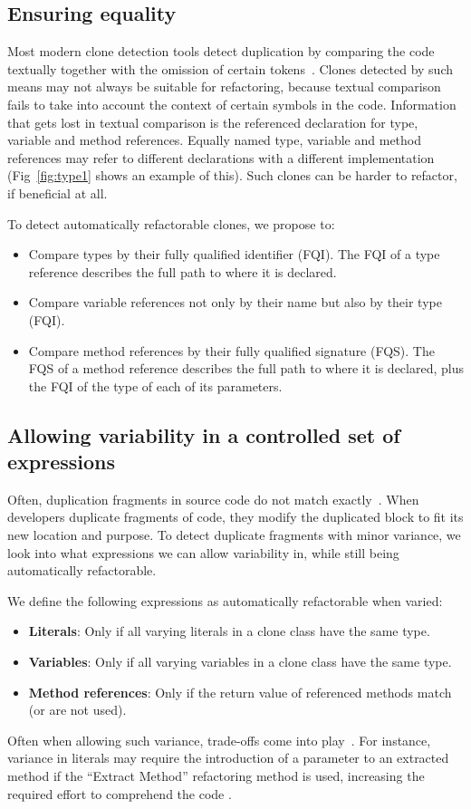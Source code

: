 \documentclass[a4paper,UKenglish,cleveref, autoref, thm-restate,authorcolumns]{lipics-v2019}
\begin{document}
\subsection{Ensuring equality}\label{sec:t1r}
Most modern clone detection tools detect duplication by comparing the code textually together with the omission of certain tokens~\cite{roy2009comparison, svajlenko2014evaluating}. Clones detected by such means may not always be suitable for refactoring, because textual comparison fails to take into account the context of certain symbols in the code. Information that gets lost in textual comparison is the referenced declaration for type, variable and method references. Equally named type, variable and method references may refer to different declarations with a different implementation (Fig~\ref{fig:type1} shows an example of this). Such clones can be harder to refactor, if beneficial at all.

To detect automatically refactorable clones, we propose to:
\begin{itemize}
  \item Compare types by their fully qualified identifier (FQI). The FQI of a type reference describes the full path to where it is declared.
  \item Compare variable references not only by their name but also by their type (FQI).
  \item Compare method references by their fully qualified signature (FQS). The FQS of a method reference describes the full path to where it is declared, plus the FQI of the type of each of its parameters.
\end{itemize}

\subsection{Allowing variability in a controlled set of expressions} \label{sec:t2r}
Often, duplication fragments in source code do not match exactly~\cite{kodhai2013method}. When developers duplicate fragments of code, they modify the duplicated block to fit its new location and purpose. To detect duplicate fragments with minor variance, we look into what expressions we can allow variability in, while still being automatically refactorable.

We define the following expressions as automatically refactorable when varied:
\begin{itemize}
  \item \textbf{Literals}: Only if all varying literals in a clone class have the same type.
  \item \textbf{Variables}: Only if all varying variables in a clone class have the same type.
  \item \textbf{Method references}: Only if the return value of referenced methods match (or are not used).
\end{itemize}
Often when allowing such variance, trade-offs come into play~\cite{krishnan2013refactoring, krishnan2014unification}. For instance, variance in literals may require the introduction of a parameter to an extracted method if the ``Extract Method'' refactoring method is used, increasing the required effort to comprehend the code \cite{heitlager2007practical}.
\end{document}
